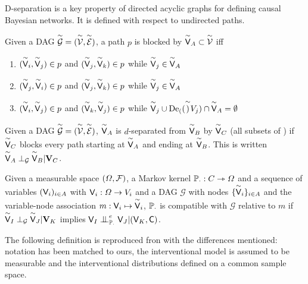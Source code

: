 D-separation is a key property of directed acyclic graphs for defining causal Bayesian networks. It is defined with respect to undirected paths.

\begin{definition}
Given a DAG $\overset{\sim}{\mathcal{G}}=(\overset{\sim}{\mathcal{V}},\overset{\sim}{\mathcal{E}})$, a path $p$ is blocked by $\overset{\sim}{\mathsf{V}}_A\subset\overset{\sim}{\mathcal{V}}$ iff
\begin{enumerate}
    \item $(\overset{\sim}{\mathsf{V}}_i,\overset{\sim}{\mathsf{V}}_j)\in p$ and $(\overset{\sim}{\mathsf{V}}_j,\overset{\sim}{\mathsf{V}}_k)\in p$ while $\overset{\sim}{\mathsf{V}}_j\in \overset{\sim}{\mathsf{V}}_A$
    \item $(\overset{\sim}{\mathsf{V}}_j,\overset{\sim}{\mathsf{V}}_i)\in p$ and $(\overset{\sim}{\mathsf{V}}_j,\overset{\sim}{\mathsf{V}}_k)\in p$ while $\overset{\sim}{\mathsf{V}}_j\in \overset{\sim}{\mathsf{V}}_A$
    \item $(\overset{\sim}{\mathsf{V}}_i,\overset{\sim}{\mathsf{V}}_j)\in p$ and $(\overset{\sim}{\mathsf{V}}_k,\overset{\sim}{\mathsf{V}}_j)\in p$ while $\overset{\sim}{\mathsf{V}}_j\cup \text{De}_{(}(\overset{\sim}{\mathsf{)}}{V}_j)\cap \overset{\sim}{\mathsf{V}}_A=\emptyset$
\end{enumerate}
\end{definition}

\begin{definition}[d-separation]
Given a DAG $\overset{\sim}{\mathcal{G}}=(\overset{\sim}{\mathcal{V}},\overset{\sim}{\mathcal{E}})$, $\overset{\sim}{\mathsf{V}}_A$ is $d$-separated from $\overset{\sim}{\mathsf{V}}_B$ by $\overset{\sim}{\mathsf{V}}_C$ (all subsets of ) if $\overset{\sim}{\mathsf{V}}_C$ blocks every path starting at $\overset{\sim}{\mathsf{V}}_A$ and ending at $\overset{\sim}{\mathsf{V}}_B$. This is written $\overset{\sim}{\mathsf{V}}_A\perp_{\mathcal{G}} \overset{\sim}{\mathsf{V}}_B | \mathbf{V}_C$.
\end{definition}

\begin{definition}[Compatibility]\label{def:compat}
Given a measurable space $(\Omega,\mathcal{F})$, a Markov kernel $\mathbb{P}_\cdot:C\rightarrowtriangle \Omega$ and a sequence of variables $(\mathsf{V}_i)_{i\in A}$ with $\mathsf{V}_i:\Omega\to V_i$ and a DAG $\mathcal{G}$ with nodes $\{\overset{\sim}{\mathsf{V}}_i\}_{i\in A}$ and the variable-node association $m:\mathsf{V}_i\mapsto \overset{\sim}{\mathsf{V}}_i$, $\mathbb{P}_\cdot$ is compatible with $\mathcal{G}$ relative to $m$ if $\overset{\sim}{\mathsf{V}}_I\perp_{\mathcal{G}} \overset{\sim}{\mathsf{V}}_J | \mathbf{V}_K$ implies $\RV{V}_I\CI^e_{\prob{P}_\cdot} \RV{V}_J | (\RV{V}_K,\RV{C})$.
\end{definition}

The following definition is reproduced fron \citet{pearl_causality:_2009} with the differences mentioned: notation has been matched to ours, the interventional model is assumed to be measurable and the interventional distributions defined on a common sample space.

